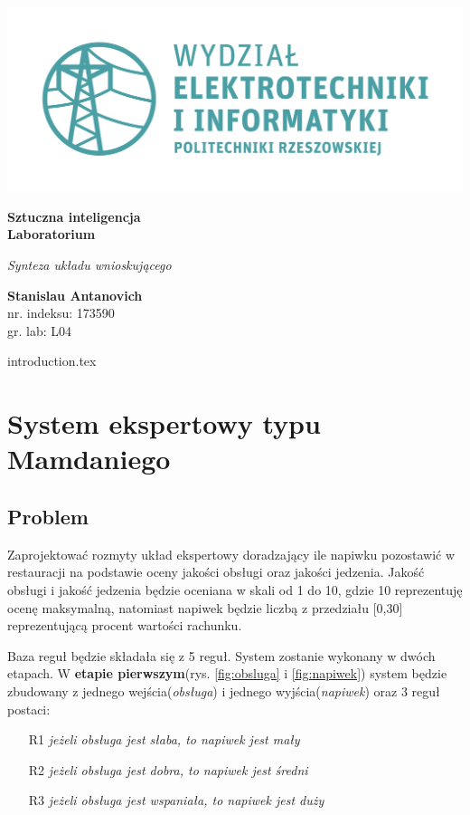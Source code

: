 \documentclass[a4paper, 10pt]{article}
\begin{document}
\begin{titlepage}
\begin{center}
	\includegraphics[scale=0.7]{logo.png}

	\vspace*{4cm}
	\textbf{Sztuczna inteligencja\\ Laboratorium}

	\vspace{1.5cm}
	\textit{Synteza układu wnioskującego}

	\vspace{1.5cm}
	\textbf{Stanislau Antanovich}\\
	nr. indeksu: 173590\\
	gr. lab: L04
\end{center}
\end{titlepage}

\tableofcontents
\listoffigures

\newpage


{introduction.tex}

\section{System ekspertowy typu Mamdaniego}\label{sec:c1}
\subsection{Problem}

Zaprojektować rozmyty układ ekspertowy doradzający ile napiwku pozostawić w restauracji na podstawie oceny jakości obsługi oraz jakości jedzenia. Jakość obsługi i jakość jedzenia będzie oceniana w skali od 1 do 10, gdzie 10 reprezentuję ocenę maksymalną, natomiast napiwek będzie liczbą z przedziału [0,30] reprezentującą procent wartości rachunku.

Baza reguł będzie składała się z 5 reguł. System zostanie wykonany w dwóch etapach. W \textbf{etapie pierwszym}(rys. \ref{fig:obsluga} i \ref{fig:napiwek}) system będzie zbudowany z jednego wejścia(\emph{obsługa}) i jednego wyjścia(\emph{napiwek}) oraz 3 reguł postaci:
\begin{itemize}
	\item[R1] \emph{jeżeli obsługa jest słaba, to napiwek jest mały}
	\item[R2] \emph{jeżeli obsługa jest dobra, to napiwek jest średni}
	\item[R3] \emph{jeżeli obsługa jest wspaniała, to napiwek jest duży}
\end{itemize}
\end{document}
